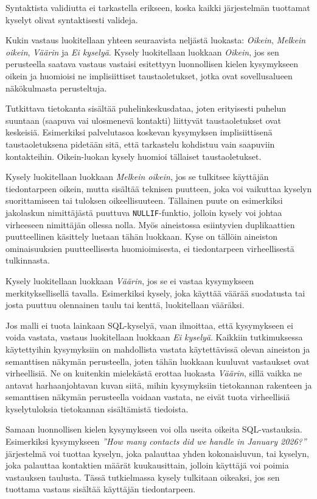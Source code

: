 Syntaktista validiutta ei tarkastella erikseen, koska kaikki järjestelmän tuottamat kyselyt olivat syntaktisesti valideja.

Kukin vastaus luokitellaan yhteen seuraavista neljästä luokasta: \textit{Oikein}, \textit{Melkein oikein}, \textit{Väärin} ja \textit{Ei kyselyä}. Kysely luokitellaan luokkaan \textit{Oikein}, jos sen perusteella saatava vastaus vastaisi esitettyyn luonnollisen kielen kysymykseen oikein ja huomioisi ne implisiittiset taustaoletukset, jotka ovat sovellusalueen näkökulmasta perusteltuja.

Tutkittava tietokanta sisältää puhelinkeskusdataa, joten erityisesti puhelun suuntaan (saapuva vai ulosmenevä kontakti) liittyvät taustaoletukset ovat keskeisiä. Esimerkiksi palvelutasoa koskevan kysymyksen implisiittisenä taustaoletuksena pidetään sitä, että tarkastelu kohdistuu vain saapuviin kontakteihin. Oikein-luokan kysely huomioi tällaiset taustaoletukset.

Kysely luokitellaan luokkaan \textit{Melkein oikein}, jos se tulkitsee
käyttäjän tiedontarpeen oikein, mutta sisältää teknisen puutteen, joka voi
vaikuttaa kyselyn suorittamiseen tai tuloksen oikeellisuuteen. Tällainen
puute on esimerkiksi jakolaskun nimittäjästä puuttuva \texttt{NULLIF}-funktio,
jolloin kysely voi johtaa virheeseen nimittäjän ollessa nolla. Myös
aineistossa esiintyvien duplikaattien puutteellinen käsittely luetaan tähän
luokkaan. Kyse on tällöin aineiston ominaisuuksien
puutteellisesta huomioimisesta, ei tiedontarpeen virheellisestä tulkinnasta.

Kysely luokitellaan luokkaan \textit{Väärin}, jos se ei vastaa kysymykseen merkityksellisellä tavalla. Esimerkiksi kysely, joka käyttää väärää suodatusta tai josta puuttuu olennainen taulu tai kenttä, luokitellaan vääräksi.

Jos malli ei tuota lainkaan SQL-kyselyä, vaan ilmoittaa, että kysymykseen ei voida vastata, vastaus luokitellaan luokkaan \textit{Ei kyselyä}. Kaikkiin tutkimuksessa käytettyihin kysymyksiin on mahdollista vastata käytettävissä olevan aineiston ja semanttisen näkymän perusteella, joten tähän luokkaan kuuluvat vastaukset ovat virheellisiä. Ne on kuitenkin mielekästä erottaa luokasta \textit{Väärin}, sillä vaikka ne antavat harhaanjohtavan kuvan siitä, mihin kysymyksiin tietokannan rakenteen ja semanttisen näkymän perusteella voidaan vastata, ne eivät tuota virheellisiä kyselytuloksia tietokannan sisältämistä tiedoista.

Samaan luonnollisen kielen kysymykseen voi olla useita oikeita SQL-vastauksia. Esimerkiksi kysymykseen \textit{”How many contacts did we handle in January 2026?”} järjestelmä voi tuottaa kyselyn, joka palauttaa yhden kokonaisluvun, tai kyselyn, joka palauttaa kontaktien määrät kuukausittain, jolloin käyttäjä voi poimia vastauksen taulusta. Tässä tutkielmassa kysely tulkitaan oikeaksi, jos sen tuottama vastaus sisältää käyttäjän tiedontarpeen.

